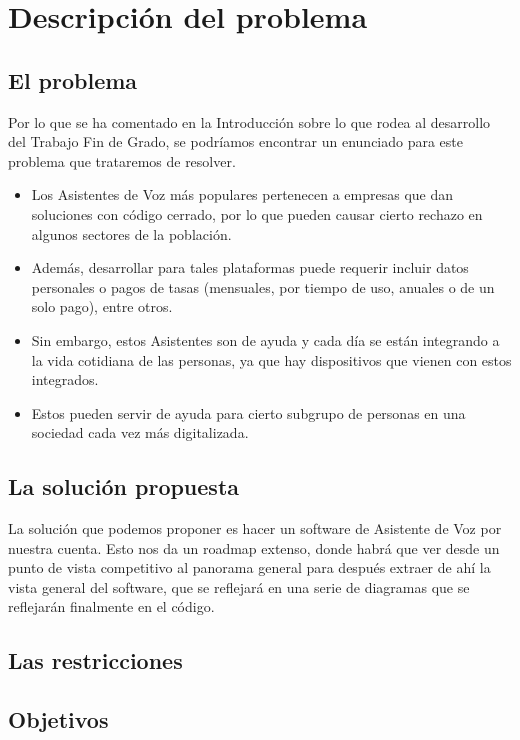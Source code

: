 \chapter{Descripción del problema}

\noindent{}
\newline

\section{El problema}
Por lo que se ha comentado en la Introducción sobre lo que rodea al desarrollo del Trabajo Fin de Grado, se podríamos encontrar un enunciado para este problema que trataremos de resolver.

\begin{itemize}
	\item Los Asistentes de Voz más populares pertenecen a empresas que dan soluciones con código cerrado, por lo que pueden causar cierto rechazo en algunos sectores de la población. 
	\item Además, desarrollar para tales plataformas puede requerir incluir datos personales o pagos de tasas (mensuales, por tiempo de uso, anuales o de un solo pago), entre otros.
	\item Sin embargo, estos Asistentes son de ayuda y cada día se están integrando a la vida cotidiana de las personas, ya que hay dispositivos que vienen con estos integrados.
	\item Estos pueden servir de ayuda para cierto subgrupo de personas en una sociedad cada vez más digitalizada.
\end{itemize}

\section{La solución propuesta}
La solución que podemos proponer es hacer un software de Asistente de Voz por nuestra cuenta. Esto nos da un roadmap extenso, donde habrá que ver desde un punto de vista competitivo al panorama general para después extraer de ahí la vista general del software, que se reflejará en una serie de diagramas que se reflejarán finalmente en el código.

\section{Las restricciones}

\section{Objetivos}



